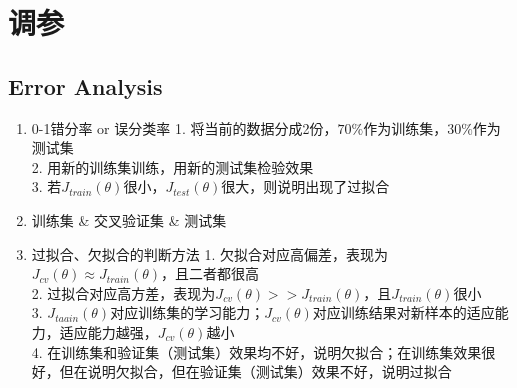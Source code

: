 \section{调参}

\subsection{Error Analysis}
\begin{enumerate}
	\item 0-1错分率 or 误分类率
	1. 将当前的数据分成2份，$70\%$作为训练集，$30\%$作为测试集\\
	2. 用新的训练集训练，用新的测试集检验效果\\
	3. 若$J_{train}(\theta)$很小，$J_{test}(\theta)$很大，则说明出现了过拟合
	\item 训练集 \& 交叉验证集 \& 测试集
	\item 过拟合、欠拟合的判断方法
	1. 欠拟合对应高偏差，表现为$J_{cv}(\theta) \approx J_{train}(\theta)$，且二者都很高 \\
	2. 过拟合对应高方差，表现为$J_{cv}(\theta) >> J_{train}(\theta)$，且$J_{train}(\theta)$很小 \\
	3. $J_{taain}(\theta)$对应训练集的学习能力；$J_{cv}(\theta)$对应训练结果对新样本的适应能力，适应能力越强，$J_{cv}(\theta)$越小 \\
	4. 在训练集和验证集（测试集）效果均不好，说明欠拟合；在训练集效果很好，但在说明欠拟合，但在验证集（测试集）效果不好，说明过拟合
\end{enumerate}

